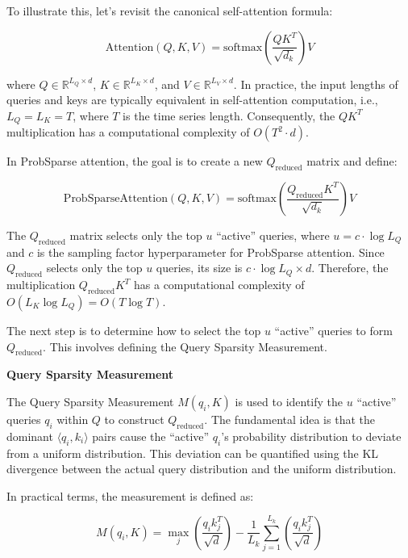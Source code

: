 To illustrate this, let’s revisit the canonical self-attention formula:

\[
\text{Attention}(Q, K, V) = \text{softmax}\left(\frac{QK^T}{\sqrt{d_k}}\right)V
\]

where \( Q \in \mathbb{R}^{L_Q \times d} \), \( K \in \mathbb{R}^{L_K \times d} \), and \( V \in \mathbb{R}^{L_V \times d} \). In practice, the input lengths of queries and keys are typically equivalent in self-attention computation, i.e., \( L_Q = L_K = T \), where \( T \) is the time series length. Consequently, the \( QK^T \) multiplication has a computational complexity of \( O(T^2 \cdot d) \).

In ProbSparse attention, the goal is to create a new \( Q_{\text{reduced}} \) matrix and define:

\[
\text{ProbSparseAttention}(Q, K, V) = \text{softmax}\left(\frac{Q_{\text{reduced}} K^T}{\sqrt{d_k}}\right)V
\]

The \( Q_{\text{reduced}} \) matrix selects only the top \( u \) ``active'' queries, where \( u = c \cdot \log L_Q \) and \( c \) is the sampling factor hyperparameter for ProbSparse attention. Since \( Q_{\text{reduced}} \) selects only the top \( u \) queries, its size is \( c \cdot \log L_Q \times d \). Therefore, the multiplication \( Q_{\text{reduced}} K^T \) has a computational complexity of \( O(L_K \log L_Q) = O(T \log T) \).

The next step is to determine how to select the top \( u \) ``active'' queries to form \( Q_{\text{reduced}} \). This involves defining the Query Sparsity Measurement.
\vspace{10pt}

\noindent\textbf{Query Sparsity Measurement}

\vspace{10pt}
\noindent The Query Sparsity Measurement \( M(q_i, K) \) is used to identify the \( u \) ``active'' queries \( q_i \) within \( Q \) to construct \( Q_{\text{reduced}} \). The fundamental idea is that the dominant \( \langle q_i, k_i \rangle \) pairs cause the ``active'' \( q_i \)'s probability distribution to deviate from a uniform distribution. This deviation can be quantified using the KL divergence between the actual query distribution and the uniform distribution.

In practical terms, the measurement is defined as:

\[
M(q_i, K) = \max_j \left( \frac{q_i k_j^T}{\sqrt{d}} \right) - \frac{1}{L_k} \sum_{j=1}^{L_k} \left( \frac{q_i k_j^T}{\sqrt{d}} \right)
\]

